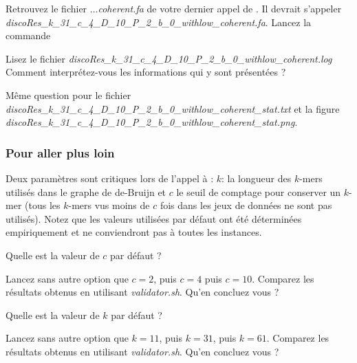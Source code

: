 \qu Retrouvez le fichier \emph{$\dots$coherent.fa} de votre dernier appel de \discopp. Il devrait s'appeler \emph{discoRes\_k\_31\_c\_4\_D\_10\_P\_2\_b\_0\_withlow\_coherent.fa}. Lancez la commande 

\qu Lisez le fichier \emph{discoRes\_k\_31\_c\_4\_D\_10\_P\_2\_b\_0\_withlow\_coherent.log}
Comment interprétez-vous les informations qui y sont présentées ?

\qu Même question pour le fichier \emph{discoRes\_k\_31\_c\_4\_D\_10\_P\_2\_b\_0\_withlow\_coherent\_stat.txt} et la figure \emph{discoRes\_k\_31\_c\_4\_D\_10\_P\_2\_b\_0\_withlow\_coherent\_stat.png}.


%

\subsubsection*{Pour aller plus loin} %
\label{ssub:pour_aller_plus_loin}
Deux paramètres sont critiques lors de l'appel à \discopp: $k$: la longueur des $k$-mers utilisés dans le graphe de de-Bruijn et $c$ le seuil de comptage pour conserver un $k$-mer (tous les $k$-mers vus moins de $c$ fois dans les jeux de données ne sont pas utilisés). Notez que les valeurs utilisées par défaut ont été déterminées empiriquement et ne conviendront pas à toutes les instances. 

\qu Quelle est la valeur de $c$ par défaut ?

\qu Lancez \discopp sans autre option que $c=2$, puis $c=4$ puis $c=10$. Comparez les résultats obtenus en utilisant \emph{validator.sh}. Qu'en concluez vous ?


\qu Quelle est la valeur de $k$ par défaut ?

\qu Lancez \discopp sans autre option que $k=11$, puis $k=31$, puis $k=61$. Comparez les résultats obtenus en utilisant \emph{validator.sh}. Qu'en concluez vous ?

